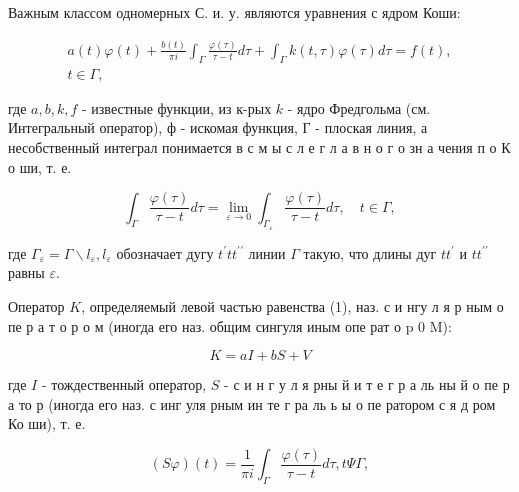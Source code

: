 \documentclass[10pt]{article}
\begin{document}
Важным классом одномерных С. и. у. являются уравнения с ядром Коши:



\[

\begin{gathered}

a(t) \varphi(t)+\frac{b(t)}{\pi i} \int_{\Gamma} \frac{\varphi(\tau)}{\tau-t} d \tau+\int_{\Gamma} k(t, \tau) \varphi(\tau) d \tau=f(t), \\

t \in \Gamma,

\end{gathered}

\]



где $a, b, k, f$ - известные функции, из к-рых $k$ - ядро Фредгольма (см. Интегральный оператор), $ф$ - искомая функция, Г - плоская линия, а несобственный интеграл понимается в с м ы с л е г л а в н о г о зн а чения п о К о ши, т. е.



\[

\int_{\Gamma} \frac{\varphi(\tau)}{\tau-t} d \tau=\lim _{\varepsilon \rightarrow 0} \int_{\Gamma_{\varepsilon}} \frac{\varphi(\tau)}{\tau-t} d \tau, \quad t \in \Gamma,

\]



где $\Gamma_{\varepsilon}=\Gamma \backslash l_{\varepsilon}, l_{\varepsilon}$ обозначает дугу $t^{\prime} t t^{\prime \prime}$ линии $\Gamma$ такую, что длины дуг $t t^{\prime}$ и $t t^{\prime \prime}$ равны $\varepsilon$.



Оператор $K$, определяемый левой частью равенства (1), наз. с и нгу л я р ным о пе р а т о р о м (иногда его наз. общим сингуля иным опе рат $о$ p 0 M):



\[

K=a I+b S+V

\]



где $I$ - тождественный оператор, $S$ - с и н г у л я рны й и т е г р а ль ны й о пе р а то р (иногда его наз. с инг уля рным ин те г ра ль ь ы о пе ратором с я д ром Ко ши), т. е.



\[

(S \varphi)(t)=\frac{1}{\pi i} \int_{\Gamma} \frac{\varphi(\tau)}{\tau-t} d \tau, t \Psi \Gamma,

\]
\end{document}
